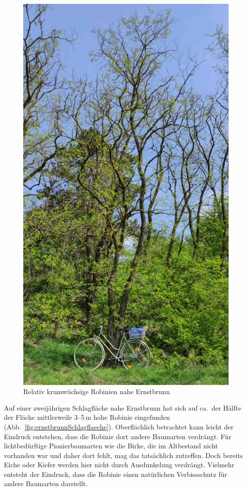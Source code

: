 \documentclass[twocolumn]{scrartcl}
\begin{document}
\begin{figure}[htbp]
  \centering
  \includegraphics[width=.9\linewidth]{./bild/roninieLokal}
  \caption{Relativ krumwüchsige Robinien nahe Ernstbrunn}
  \label{fig:robLokalErnstbrunn}
\end{figure}

Auf einer zweijährigen Schlagfläche nahe Ernstbrunn hat sich auf
ca.\ der Hälfte der Fläche mittlerweile 3--5\,m hohe Robinie
eingefunden (Abb.~\ref{fig:ernstbrunnSchlagflaeche}). Oberflächlich
betrachtet kann leicht der Eindruck entstehen, dass die Robinie dort
andere Baumarten verdrängt. Für lichtbedürftige Pionierbaumarten wie
die Birke, die im Altbestand nicht vorhanden war und daher dort fehlt,
mag das tatsächlich zutreffen. Doch bereits Eiche oder Kiefer werden
hier nicht durch Ausdunkelung verdrängt. Vielmehr entsteht der
Eindruck, dass die Robinie einen natürlichen Verbissschutz für andere
Baumarten darstellt.
\end{document}
